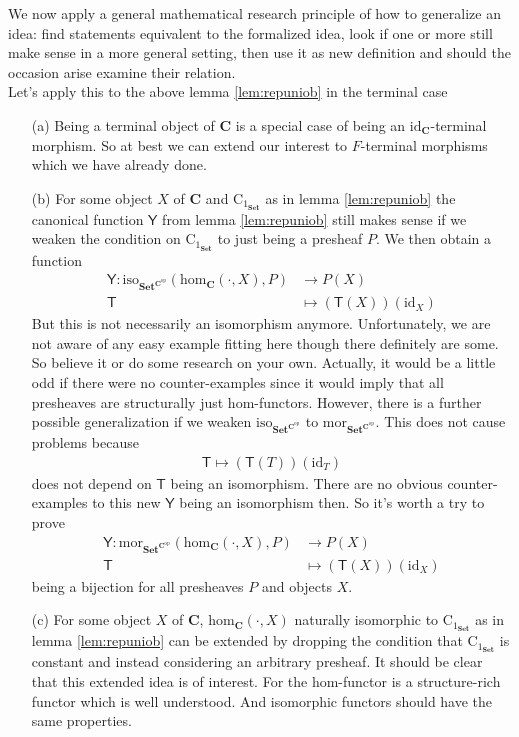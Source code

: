 We now apply a general mathematical research principle of how to generalize an idea: find statements equivalent to the formalized idea, look if one or more still make sense in a more general setting, then use it as new definition and should the occasion arise examine their relation.
\\
Let's apply this to the above lemma \ref{lem:repuniob} in the terminal case
\begin{enumerate}
\item[(a)]
Being a terminal object of $\mathbf{C}$ is a special case of being an $\mathrm{id}_{\mathbf{C}}$-terminal morphism. So at best we can extend our interest to $F$-terminal morphisms which we have already done.
\item[(b)]
For some object $X$ of $\mathbf{C}$ and $\mathrm{C}_{1_{\mathbf{Set}}}$ as in lemma \ref{lem:repuniob} the canonical function $\mathsf{Y}$ from lemma \ref{lem:repuniob} still makes sense if we weaken the condition on $\mathrm{C}_{1_{\mathbf{Set}}}$ to just being a presheaf $P$. We then obtain a function
\begin{align*}
  \mathsf{Y}
  \colon
  \mathrm{iso}_{\mathbf{Set}^{\mathbf{C}^{\mathrm{op}}}}
  \left(
    \mathrm{hom}_{\mathbf{C}}(\cdot,X),
    P
  \right)
  &\rightarrow
  P(X)
  \\
  \mathsf{T}
  &\mapsto
  (\mathsf{T}(X))(\mathrm{id}_{X})
\end{align*}
But this is not necessarily an isomorphism anymore. Unfortunately, we are not aware of any easy example fitting here though there definitely are some. So believe it or do some research on your own. Actually, it would be a little odd if there were no counter-examples since it would imply that all presheaves are structurally just hom-functors. However, there is a further possible generalization if we weaken $\mathrm{iso}_{\mathbf{Set}^{\mathbf{C}^{\mathrm{op}}}}$ to $\mathrm{mor}_{\mathbf{Set}^{\mathbf{C}^{\mathrm{op}}}}$. This does not cause problems because
\begin{align*}
  \mathsf{T}
  \mapsto
  (\mathsf{T}(T))(\mathrm{id}_{T})
\end{align*}
does not depend on $\mathsf{T}$ being an isomorphism. There are no obvious counter-examples to this new $\mathsf{Y}$ being an isomorphism then. So it's worth a try to prove
\begin{align*}
  \mathsf{Y}
  \colon
  \mathrm{mor}_{\mathbf{Set}^{\mathbf{C}^{\mathrm{op}}}}
  \left(
    \mathrm{hom}_{\mathbf{C}}(\cdot,X),
    P
  \right)
  &\rightarrow
  P(X)
  \\
  \mathsf{T}
  &\mapsto
  (\mathsf{T}(X))(\mathrm{id}_{X})
\end{align*}
being a bijection for all presheaves $P$ and objects $X$.
\item[(c)]
For some object $X$ of $\mathbf{C}$, $\mathrm{hom}_{\mathbf{C}}(\cdot,X)$ naturally isomorphic to $\mathrm{C}_{1_{\mathbf{Set}}}$ as in lemma \ref{lem:repuniob} can be extended by dropping the condition that $\mathrm{C}_{1_{\mathbf{Set}}}$ is constant and instead considering an arbitrary presheaf. It should be clear that this extended idea is of interest. For the hom-functor is a structure-rich functor which is well understood. And isomorphic functors should have the same properties.
\end{enumerate}
